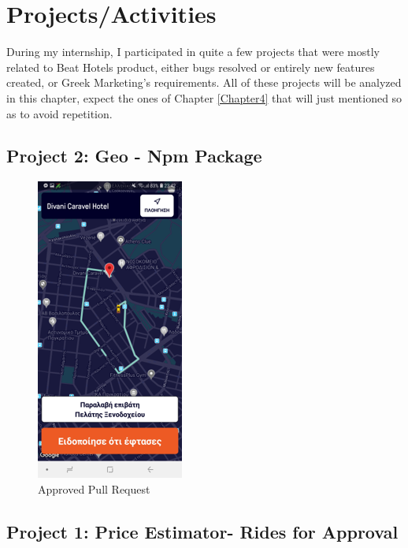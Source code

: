 
\chapter{Projects/Activities} %

\label{Chapter3}

During my internship, I participated in quite a few projects that were mostly related to Beat Hotels product, either bugs resolved or entirely new features created, or Greek Marketing’s requirements. All of these projects will be analyzed in this chapter, expect the ones of Chapter \ref{Chapter4} that will just mentioned so as to avoid repetition.

\section{Project 2: Geo - Npm Package}


\begin{figure}[H]
	\begin{center}
		\includegraphics[scale=0.45]{images/my_projects/price_estimator.png}
	\end{center}
	\caption{Approved Pull Request}
\end{figure}

\section{Project 1: Price Estimator- Rides for Approval}

